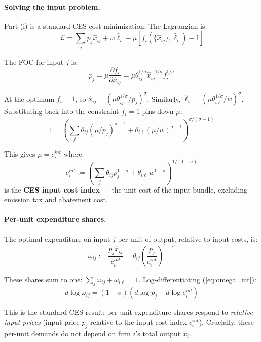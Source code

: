 \documentclass[11pt]{article}
\begin{document}
\paragraph{Solving the input problem.} Part (i) is a standard CES cost minimization. The Lagrangian is:
$$\mathcal{L} = \sum_j p_j \hat{x}_{ij} + w\hat{\ell}_i - \mu\left[f_i(\{\hat{x}_{ij}\}, \hat{\ell}_i) - 1\right]$$

The FOC for input $j$ is:
$$p_j = \mu \frac{\partial f_i}{\partial \hat{x}_{ij}} = \mu \theta_{ij}^{1/\sigma} \hat{x}_{ij}^{-1/\sigma} f_i^{1/\sigma}$$

At the optimum $f_i = 1$, so $\hat{x}_{ij} = (\mu \theta_{ij}^{1/\sigma}/p_j)^{\sigma}$. Similarly, $\hat{\ell}_i = (\mu\theta_{i\ell}^{1/\sigma}/w)^{\sigma}$. Substituting back into the constraint $f_i = 1$ pins down $\mu$:
$$1 = \left(\sum_j \theta_{ij} (\mu/p_j)^{\sigma-1} + \theta_{i\ell}(\mu/w)^{\sigma-1}\right)^{\sigma/(\sigma-1)}$$

This gives $\mu = c_i^{int}$ where:
\begin{equation}
    \label{eq:cint}
    c_i^{int} := \left(\sum_j \theta_{ij} p_j^{1-\sigma} + \theta_{i\ell}\, w^{1-\sigma}\right)^{1/(1-\sigma)}
\end{equation}
is the \textbf{CES input cost index} --- the unit cost of the input bundle, excluding emission tax and abatement cost.

\paragraph{Per-unit expenditure shares.} The optimal expenditure on input $j$ per unit of output, relative to input costs, is:
\begin{equation}
    \label{eq:omega_int}
    \omega_{ij} := \frac{p_j \hat{x}_{ij}}{c_i^{int}} = \theta_{ij}\left(\frac{p_j}{c_i^{int}}\right)^{1-\sigma}
\end{equation}

These shares sum to one: $\sum_j \omega_{ij} + \omega_{i\ell} = 1$. Log-differentiating (\ref{eq:omega_int}):
\begin{equation}
    \label{eq:dlog_omega_int}
    d\log \omega_{ij} = (1-\sigma)(d\log p_j - d\log c_i^{int})
\end{equation}

This is the standard CES result: per-unit expenditure shares respond to \textit{relative input prices} (input price $p_j$ relative to the input cost index $c_i^{int}$). Crucially, these per-unit demands do not depend on firm $i$'s total output $x_i$.
\end{document}
